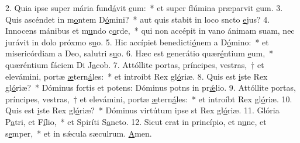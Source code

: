 2. Quia ipse super mária fund\uline{á}vit \uline{e}um:~* et super flúmina præparvit \uline{e}um.
3. Quis ascéndet in m\uline{o}ntem D\uline{ó}mini?~* aut quis stabit in loco sncto \uline{e}jus?
4. Innocens mánibus et m\uline{u}ndo c\uline{o}rde,~* qui non accépit in vano ánimam suam, nec jurávit in dolo próxmo s\uline{u}o.
5. Hic accípiet benedicti\uline{ó}nem a D\uline{ó}mino:~* et misericórdiam a Deo, salutri s\uline{u}o.
6. Hæc est generátio quær\uline{é}ntium \uline{e}um,~* quæréntium fáciem Di J\uline{a}cob.
7. Attóllite portas, príncipes, vestras,~† et elevámini, portæ \uline{æ}tern\uline{á}les:~* et introíbt Rex gl\uline{ó}riæ.
8. Quis est \uline{i}ste Rex gl\uline{ó}riæ?~* Dóminus fortis et potens: Dóminus potns in pr\uline{ǽ}lio.
9. Attóllite portas, príncipes, vestras,~† et elevámini, portæ \uline{æ}tern\uline{á}les:~* et introíbt Rex gl\uline{ó}riæ.
10. Quis est \uline{i}ste Rex gl\uline{ó}riæ?~* Dóminus virtútum ipse st Rex gl\uline{ó}riæ.
11. Glória P\uline{a}tri, et F\uline{í}lio,~* et Spiríti S\uline{a}ncto.
12. Sicut erat in princípio, et n\uline{u}nc, et s\uline{e}mper,~* et in sǽcula sæculrum. \uline{A}men.
